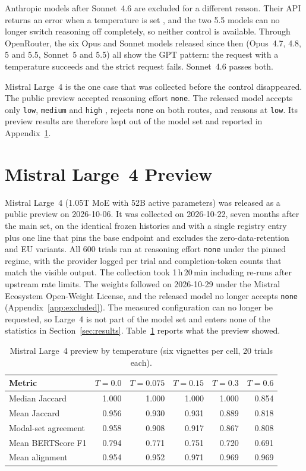 Anthropic models after Sonnet~4.6 are excluded for a different reason. Their API returns an error when a temperature is set \citep{anthropic2026sonnet5}, and the two 5.5 models can no longer switch reasoning off completely, so neither control is available. Through OpenRouter, the six Opus and Sonnet models released since then (Opus~4.7, 4.8, 5 and 5.5, Sonnet~5 and 5.5) all show the GPT pattern: the request with a temperature succeeds and the strict request fails. Sonnet~4.6 passes both.

Mistral Large~4 is the one case that was collected before the control disappeared. The public preview accepted reasoning effort \texttt{none}. The released model accepts only \texttt{low}, \texttt{medium} and \texttt{high} \citep{mistral2026reasoning}, rejects \texttt{none} on both routes, and reasons at \texttt{low}. Its preview results are therefore kept out of the model set and reported in Appendix~\ref{app:large4}.

\section{Mistral Large~4 Preview}
\label{app:large4}

Mistral Large~4 (1.05T MoE with 52B active parameters) was released as a public preview on 2026-10-06. It was collected on 2026-10-22, seven months after the main set, on the identical frozen histories and with a single registry entry plus one line that pins the base endpoint and excludes the zero-data-retention and EU variants. All 600 trials ran at reasoning effort \texttt{none} under the pinned regime, with the provider logged per trial and completion-token counts that match the visible output. The collection took 1\,h\,20\,min including re-runs after upstream rate limits. The weights followed on 2026-10-29 under the Mistral Ecosystem Open-Weight License, and the released model no longer accepts \texttt{none} (Appendix~\ref{app:excluded}). The measured configuration can no longer be requested, so Large~4 is not part of the model set and enters none of the statistics in Section~\ref{sec:results}. Table~\ref{tab:large4} reports what the preview showed.

\begin{table}[h]
  \centering\small
  \begin{tabular}{lrrrrr}
    \toprule
    Metric & $T{=}0.0$ & $T{=}0.075$ & $T{=}0.15$ & $T{=}0.3$ & $T{=}0.6$ \\
    \midrule
    Median Jaccard & 1.000 & 1.000 & 1.000 & 1.000 & 0.854 \\
    Mean Jaccard & 0.956 & 0.930 & 0.931 & 0.889 & 0.818 \\
    Modal-set agreement & 0.958 & 0.908 & 0.917 & 0.867 & 0.808 \\
    Mean BERTScore F1 & 0.794 & 0.771 & 0.751 & 0.720 & 0.691 \\
    Mean alignment & 0.954 & 0.952 & 0.971 & 0.969 & 0.969 \\
    \bottomrule
  \end{tabular}
  \caption{Mistral Large~4 preview by temperature (six vignettes per cell, 20 trials each).}
  \label{tab:large4}
\end{table}

